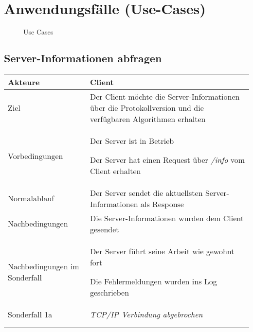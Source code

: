 \documentclass[a4paper,10pt,titlepage]{article}
\makeatletter
\newcommand\novspace{\@minipagetrue}
\newenvironment{owncompactitem}{%
\compactitem
}{%
\@finalstrut\@arstrutbox
\@nameuse{endcompactitem}%
\aftergroup\let\aftergroup\@finalstrut\aftergroup\@gobble
}
\newenvironment{owncompactenum}{%
\compactenum
}{%
\@finalstrut\@arstrutbox
\@nameuse{endcompactenum}%
\aftergroup\let\aftergroup\@finalstrut\aftergroup\@gobble
}
\newcommand{\usecase}[7]
{\subsection{#1}
\setlength{\extrarowheight}{2pt}
\begin{tabular}{|p{0.2\textwidth}|p{0.9\textwidth}|}
\hline
  Akteure & #2\\\hline
  Ziel & #3\\\hline
  Vorbedingungen & \novspace
  	\begin{owncompactitem}[-] #4 \end{owncompactitem} \\\hline
  Normalablauf & \vspace{-7pt}
  	\begin{owncompactenum}[1.] #6 \end{owncompactenum} \\\hline
  Nachbedingungen & \novspace
  	\begin{owncompactitem}[-] #5 \end{owncompactitem} \\\hline
  #7
\end{tabular}
}
\newcommand{\sonderfall}[4][\empty]
{
Sonderfall #2 & \vspace{-10pt}
	\textit{#3}
	\begin{owncompactenum}[{#2}.1] {#4} \end{owncompactenum}
  	\ifthenelse{\equal{#1}{\empty}}
    	{\\\hline} %
    	{\ensuremath{\rightarrow} #1 \\ [+1pt] \hline} %

}
\newcommand{\kurzersonderfall}[3][\empty]
{
Sonderfall #2 & \vspace{-10pt}
	\textit{#3}
  	\ifthenelse{\equal{#1}{\empty}}
    	{\\\hline} %
    	{\\&\ensuremath{\rightarrow} #1 \\ [+1pt] \hline} %

}
\newcommand{\sondernachbedingung}[1]
{
Nachbedingungen im Sonderfall& \novspace
	\begin{owncompactitem}[-]
		#1
	\end{owncompactitem} \\\hline
}
\makeatother
\begin{document}
\clearpage
\section{Anwendungsfälle (Use-Cases)}
\begin{figure}[H]
  \centering
  \caption{Use Cases}
\end{figure}




{%
}{%
}{%
}{%
}{%
}

{%
}{%
}

{%
}

\usecase{Server-Informationen abfragen}{Client}%
{%
Der Client möchte die Server-Informationen über die Protokollversion und die verfügbaren Algorithmen erhalten
}{%
\item Der Server ist in Betrieb
\item Der Server hat einen Request über \textit{/info} vom Client erhalten
}{%
\item Die Server-Informationen wurden dem Client gesendet
}{%
\item Der Server sendet die aktuellsten Server-Informationen als Response
}{%
\sondernachbedingung{
	\item Der Server führt seine Arbeit wie gewohnt fort
	\item Die Fehlermeldungen wurden ins Log geschrieben}

\sonderfall[Weiter mit normalem Betrieb]{1a}%
	{%
	TCP/IP Verbindung abgebrochen
	}{%
	\item Fehlermeldung "`TCP/IP Verbindung abgebrochen"' ins Log schreiben}
}
\end{document}
